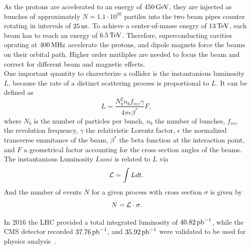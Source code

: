 As the protons are accelerated to an energy of $450\,\text{Ge\hspace{-.08em}V}$, they are injected as bunches of approximately $N=1.1\cdot10^{10}$ partiles into the two beam pipes counter rotating in intervals of $25\,\text{ns}$. To achieve a center-of-masse enegry of $13\,\text{Te\hspace{-.08em}V}$, each beam has to reach an energy of $6.5\,\text{Te\hspace{-.08em}V}$. Therefore, superconducting cavities oprating at $400\,\text{MHz}$ accelerate the protons, and dipole magnets force the beams on their orbital path. Higher order mutliples are needed to focus the beam and correct for different beam and magnetic effects.\\
One important quantity to charecterize a collider is the instantanious luminosity $L$, because the rate of a distinct scattering process is proportional to $L$. It can be defined as
\begin{equation}
 L = \frac{N_{b}^2 n_{b} f_{rev} \gamma} {4\pi \epsilon \beta^{*}}F,
\end{equation}
where $N_b$ is the number of particles per bunch, $n_b$ the number of bunches, $f_{rev}$ the revolution frequency, $\gamma$ the relativistic Lorentz factor, $\epsilon$ the normalized transverse emmitance of the beam, $\beta^{*}$ the beta function at the interaction point, and $F$ a geometrical factor accounting for the cross section angles of the beams. The instantanious Luminosity $Lumi$ is related to $L$ via
\begin{equation}
 \mathcal{L}= \int L dt.
\end{equation}
And the number of events $N$ for a given process with cross section $\sigma$ is given by
\begin{equation}
 N= \mathcal{L} \cdot \sigma.
\end{equation}

In 2016 the LHC provided a total integrated luminosity of $40.82\mbox{\ensuremath{\,\text{pb}^\text{$-$1}}}$, while the CMS detector recorded $37.76\mbox{\ensuremath{\,\text{pb}^\text{$-$1}}}$, and $35.92\mbox{\ensuremath{\,\text{pb}^\text{$-$1}}}$ were validated to be used for physics analysis~\cite{DataQuality}.





